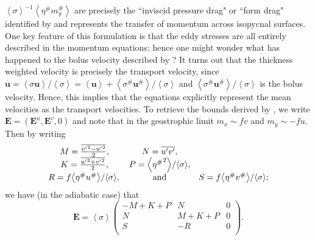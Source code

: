 \documentclass[12pt,a4paper]{report}
\newcommand*\thkmean[1]{\overline{#1}}
\newcommand*\thkres[1]{{#1}^{\prime}}
\newcommand*\nthkmean[1]{\left\langle{#1}\right\rangle}
\newcommand*\nthkres[1]{{#1}^{\#}}
\begin{document}
                   $\nthkmean{\sigma}^{-1}\nthkmean{\nthkres{\eta}\nthkres{m}_{y}}$ are
                   precisely the ``inviscid pressure drag"  or ``form drag" identified
                   by \cite{rhines1979theoretical} and represents the transfer of momentum
                   across isopycnal surfaces. One key feature of this formulation
                   is that the eddy stresses are all entirely described in the momentum
                   equations; hence one might wonder what has happened to 
                   the bolus velocity described by \cite{gent1995parameterizing}? 
                   It turns out that the thickness weighted velocity is precisely 
                   the transport velocity, since $\thkmean{\boldsymbol{u}}=\nthkmean{\sigma\boldsymbol{u}}/\nthkmean{\sigma}=\nthkmean{\boldsymbol{u}} + \nthkmean{\nthkres{\sigma}\nthkres{\boldsymbol{u}}}/\nthkmean{\sigma}$
                   and  $\nthkmean{\nthkres{\sigma}\nthkres{\boldsymbol{u}}}/\nthkmean{\sigma}$
                   is the bolus velocity. Hence, this implies that  the equations explicitly
                    represent the mean velocities as the  transport velocities.
                     To retrieve the bounds derived by \cite{marshall2012framework},
                     we write $\boldsymbol{E} = (\boldsymbol{E}^{u}, \boldsymbol{E}^{v}, 0)$
                     and note that in the geostrophic limit $m_x \sim fv$ and  $m_y \sim -fu$.
                     Then by writing 
                     \begin{equation}
                     \begin{array}{ccc}
                     M = \frac{\thkmean{{\thkres{v}}^{2} - {\thkres{u}}^{2}}}{2}, & 
                     N = \thkmean{\thkres{u}\thkres{v} }, \\
                     K = \frac{\thkmean{{\thkres{u}}^{2} + {\thkres{v}}^{2}}}{2}, & 
                     P =  {\nthkmean{{\nthkres{\eta}}^{2}}}/{\nthkmean{\sigma}},  \\ 
                     R =  f{\nthkmean{\nthkres{\eta}\nthkres{u}}}/{\nthkmean{\sigma}}, \, & \rm and  &  
                     S = f{\nthkmean{\nthkres{\eta}\nthkres{v}}}/{\nthkmean{\sigma}} ;
                     \end{array} 
                     \end{equation}
                     we have (in the adiabatic case) that
                     \begin{equation}
                     \boldsymbol{E}=\nthkmean{\sigma}\left(
                     \begin{array}{ccc}
                     -M+K+P & N & 0 \\
                     N & M+K+P & 0 \\
                     S & -R & 0 \\
                     \end{array}\right).
                     \end{equation}
\end{document}
